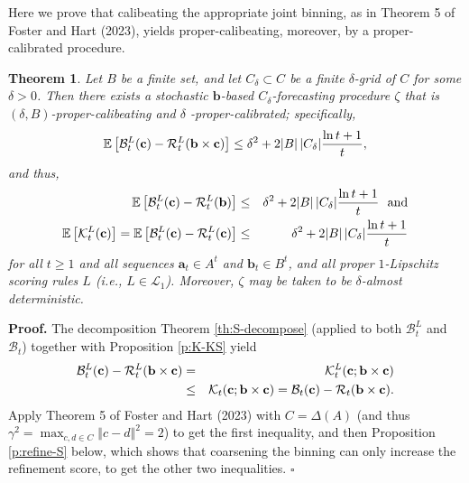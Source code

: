 \documentclass[12pt,a4paper,notitlepage]{article}
\newtheorem{theorem}{Theorem}
\newenvironment{proof}[1][Proof]{\noindent\textbf{#1.} }{\hfill $\square$}
\begin{document}
Here we prove that calibeating the appropriate joint binning, as in Theorem
5 of Foster and Hart (2023), yields proper-calibeating, moreover, by a
proper-calibrated procedure.

\begin{theorem}
\label{th:beat-by-calib S}Let $B$ be a finite set, and let $C_{\delta
}\subset C$ be a finite $\delta $-grid of $C$ for some $\delta >0$. Then
there exists a stochastic $\mathbf{b}$-based $C_{\delta }$-forecasting
procedure $\zeta $ that is $(\delta ,B)$-proper-calibeating and $\delta $%
-proper-calibrated; specifically,%
\begin{equation*}
\mathbb{E}\left[ \mathcal{B}_{t}^{L}(\mathbf{c})-\mathcal{R}_{t}^{L}(\mathbf{%
b}\times \mathbf{c})\right] \leq \delta ^{2}+2|B|\,|C_{\delta }|\frac{\ln t+1%
}{t},
\end{equation*}%
and thus,%
\begin{eqnarray*}
\mathbb{E}\left[ \mathcal{B}_{t}^{L}(\mathbf{c})-\mathcal{R}_{t}^{L}(\mathbf{%
b})\right] &\leq &\delta ^{2}+2|B|\,|C_{\delta }|\frac{\ln t+1}{t}\text{\ \
and} \\
\mathbb{E}\left[ \mathcal{K}_{t}^{L}(\mathbf{c})\right] =\mathbb{E}\left[ 
\mathcal{B}_{t}^{L}(\mathbf{c})-\mathcal{R}_{t}^{L}(\mathbf{c})\right] &\leq
&\delta ^{2}+2|B|\,|C_{\delta }|\frac{\ln t+1}{t}
\end{eqnarray*}%
for all $t\geq 1$ and all sequences $\mathbf{a}_{t}\in A^{t}$ and $\mathbf{b}%
_{t}\in B^{t}$, and all proper $1$-Lipschitz scoring rules $L$ (i.e., $L\in 
\mathcal{L}_{1}$). Moreover, $\zeta $ may be taken to be $\delta $-almost
deterministic.
\end{theorem}

\begin{proof}
The decomposition Theorem \ref{th:S-decompose} (applied to both $\mathcal{B}%
_{t}^{L}$ and $\mathcal{B}_{t}$) together with Proposition \ref{p:K-KS} yield%
\begin{eqnarray*}
\mathcal{B}_{t}^{L}(\mathbf{c})-\mathcal{R}_{t}^{L}(\mathbf{b}\times \mathbf{%
c}) &=&\mathcal{K}_{t}^{L}(\mathbf{c};\mathbf{b}\times \mathbf{c}) \\
&\leq &\mathcal{K}_{t}(\mathbf{c};\mathbf{b}\times \mathbf{c})=\mathcal{B}%
_{t}(\mathbf{c})-\mathcal{R}_{t}(\mathbf{b}\times \mathbf{c}).
\end{eqnarray*}%
Apply Theorem 5 of Foster and Hart (2023) with $C=\Delta (A)$ (and thus $%
\gamma ^{2}=\max_{c,d\in C}\left\Vert c-d\right\Vert ^{2}=2$) to get the
first inequality, and then Proposition \ref{p:refine-S} below, which shows
that coarsening the binning can only increase the refinement score, to get
the other two inequalities.
\end{proof}
\end{document}
